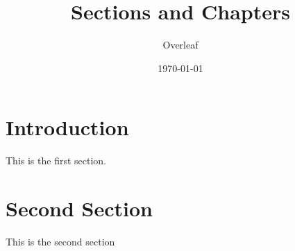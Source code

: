 \documentclass{report}
\title{Sections and Chapters}
\author{Overleaf}
\date{\today}
\begin{document}
\maketitle
\section{Introduction}

This is the first section.



\section{Second Section}
This is the second section
\end{document}
